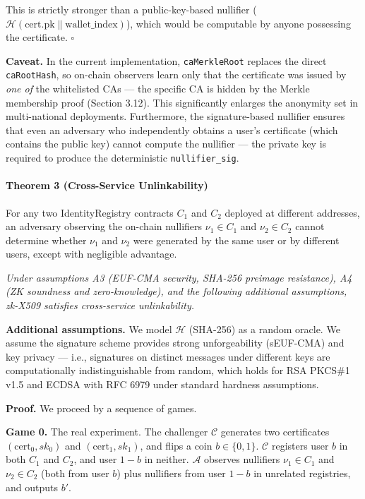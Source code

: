 \documentclass[11pt, a4paper]{article}
\begin{document}
This is strictly stronger than a public-key-based nullifier
(\(\mathcal{H}(\text{cert.pk} \| \text{wallet\_index})\)), which would
be computable by anyone possessing the certificate. \(\square\)

\textbf{Caveat.} In the current implementation, \texttt{caMerkleRoot}
replaces the direct \texttt{caRootHash}, so on-chain observers learn
only that the certificate was issued by \emph{one of} the whitelisted
CAs --- the specific CA is hidden by the Merkle membership proof
(Section 3.12). This significantly enlarges the anonymity set in
multi-national deployments. Furthermore, the signature-based nullifier
ensures that even an adversary who independently obtains a user's
certificate (which contains the public key) cannot compute the nullifier
--- the private key is required to produce the deterministic
\texttt{nullifier\_sig}.

\paragraph{Theorem 3 (Cross-Service Unlinkability)}\label{theorem-3-cross-service-unlinkability} For any two
IdentityRegistry contracts \(C_1\) and \(C_2\) deployed at different
addresses, an adversary observing the on-chain nullifiers
\(\nu_1 \in C_1\) and \(\nu_2 \in C_2\) cannot determine whether
\(\nu_1\) and \(\nu_2\) were generated by the same user or by different
users, except with negligible advantage.

\emph{Under assumptions A3 (EUF-CMA security, SHA-256 preimage
resistance), A4 (ZK soundness and zero-knowledge), and the following
additional assumptions, zk-X509 satisfies cross-service unlinkability.}

\textbf{Additional assumptions.} We model \(\mathcal{H}\) (SHA-256) as a
random oracle. We assume the signature scheme provides strong
unforgeability (sEUF-CMA) and key privacy --- i.e., signatures on
distinct messages under different keys are computationally
indistinguishable from random, which holds for RSA PKCS\#1 v1.5 and
ECDSA with RFC 6979 under standard hardness assumptions.

\textbf{Proof.} We proceed by a sequence of games.

\textbf{Game 0.} The real experiment. The challenger \(\mathcal{C}\)
generates two certificates \((\text{cert}_0, sk_0)\) and
\((\text{cert}_1, sk_1)\), and flips a coin \(b \in \{0, 1\}\).
\(\mathcal{C}\) registers user \(b\) in both \(C_1\) and \(C_2\), and
user \(1-b\) in neither. \(\mathcal{A}\) observes nullifiers
\(\nu_1 \in C_1\) and \(\nu_2 \in C_2\) (both from user \(b\)) plus
nullifiers from user \(1-b\) in unrelated registries, and outputs
\(b'\).
\end{document}
